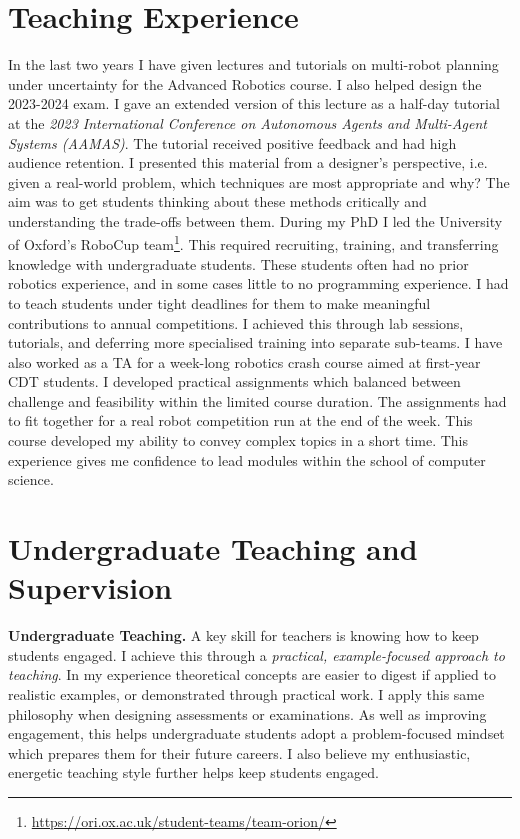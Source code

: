 \documentclass[12pt]{article}
\begin{document}
\section*{Teaching Experience}

In the last two years I have given lectures and tutorials on multi-robot planning under uncertainty for the Advanced Robotics course.
%
I also helped design the 2023-2024 exam.
%
I gave an extended version of this lecture as a half-day tutorial at the \emph{2023 International Conference on Autonomous Agents and Multi-Agent Systems (AAMAS)}.
%
The tutorial received positive feedback and had high audience retention.
%
I presented this material from a designer's perspective, i.e. given a real-world problem, which techniques are most appropriate and why?
%
The aim was to get students thinking about these methods critically and understanding the trade-offs between them.
%
During my PhD I led the University of Oxford's RoboCup team\footnote{\url{https://ori.ox.ac.uk/student-teams/team-orion/}}.
%
This required recruiting, training, and transferring knowledge with undergraduate students.
%
These students often had no prior robotics experience, and in some cases little to no programming experience.
%
I had to teach students under tight deadlines for them to make meaningful contributions to annual competitions. 
%
I achieved this through lab sessions, tutorials, and deferring more specialised training into separate sub-teams.
%
%
I have also worked as a TA for a week-long robotics crash course aimed at first-year CDT students.
%
I developed practical assignments which balanced between challenge and feasibility within the limited course duration.
%
The assignments had to fit together for a real robot competition run at the end of the week.
%
This course developed my ability to convey complex topics in a short time.
%
This experience gives me confidence to lead modules within the school of computer science.

\section*{Undergraduate Teaching and Supervision}

\vspace*{1ex}\noindent\textbf{Undergraduate Teaching.} A key skill for teachers is knowing how to keep students engaged.
%
I achieve this through a \emph{practical, example-focused approach to teaching}.
%
In my experience theoretical concepts are easier to digest if applied to realistic examples, or demonstrated through practical work.
%
I apply this same philosophy when designing assessments or examinations.
%
As well as improving engagement, this helps undergraduate students adopt a problem-focused mindset which prepares them for their future careers.
%
I also believe my enthusiastic, energetic teaching style further helps keep students engaged.
\end{document}

